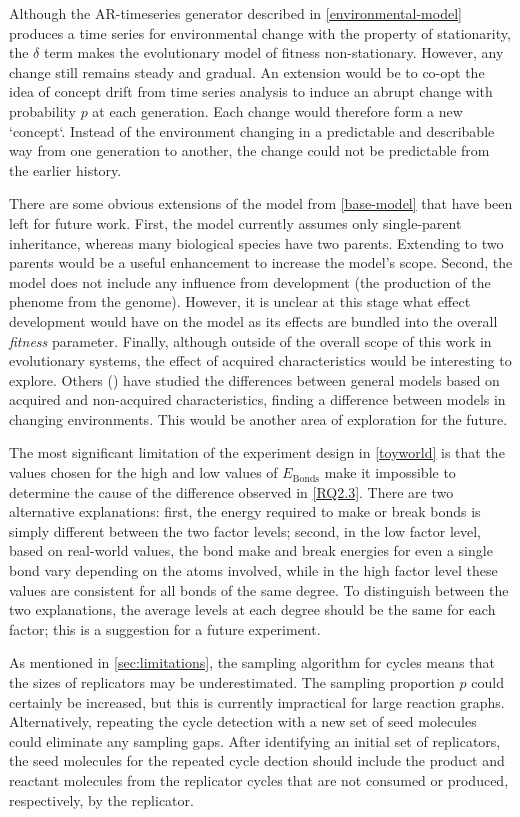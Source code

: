 Although the AR-timeseries generator described in \cref{environmental-model} produces a time series for environmental change with the property of stationarity, the $\delta$ term makes the evolutionary model of fitness non-stationary. However, any change still remains steady and gradual. An extension would be to co-opt the idea of concept drift from time series analysis to induce an abrupt change with probability $p$ at each generation. Each change would therefore form a new `concept`. Instead of the environment changing in a predictable and describable way from one generation to another, the change could not be predictable from the earlier history.

There are some obvious extensions of the model from \cref{base-model} that have been left for future work. First, the model currently assumes only single-parent inheritance, whereas many biological species have two parents. Extending to two parents would be a useful enhancement to increase the model's scope. Second, the model does not include any influence from development (the production of the phenome from the genome). However, it is unclear at this stage what effect development would have on the model as its effects are bundled into the overall \emph{fitness} parameter. Finally, although outside of the overall scope of this work in evolutionary systems, the effect of acquired characteristics would be interesting to explore. Others (\eg \textcite{Gaucherel2012,Paenke:2007ie,Sasaki:2000dq}) have studied the differences between general models based on acquired and non-acquired characteristics, finding a difference between models in changing environments. This would be another area of exploration for the future.

The most significant limitation of the experiment design in \cref{toyworld} is that the values chosen for the high and low values of $E_\mathrm{Bonds}$ make it impossible to determine the cause of the difference observed in \cref{RQ2.3}. There are two alternative explanations: first, the energy required to make or break bonds is simply different between the two factor levels; second, in the low factor level, based on real-world values, the bond make and break energies for even a single bond vary depending on the atoms involved, while in the high factor level these values are consistent for all bonds of the same degree. To distinguish between the two explanations, the average levels at each degree should be the same for each factor; this is a suggestion for a future experiment.

As mentioned in \cref{sec:limitations}, the sampling algorithm for cycles means that the sizes of replicators may be underestimated. The sampling proportion $p$ could certainly be increased, but this is currently impractical for large reaction graphs. Alternatively, repeating the cycle detection with a new set of seed molecules could eliminate any sampling gaps. After identifying an initial set of replicators, the seed molecules for the repeated cycle dection should include the product and reactant molecules from the replicator cycles that are not consumed or produced, respectively, by the replicator.

